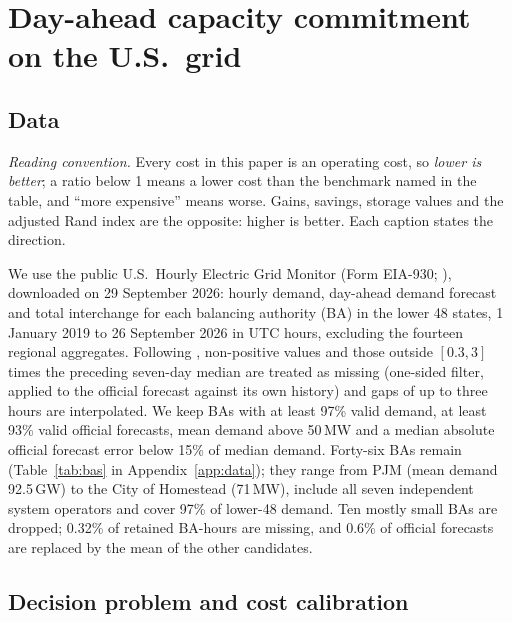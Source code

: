 \section{Day-ahead capacity commitment on the U.S.\ grid}\label{sec:app}

\subsection{Data}

\emph{Reading convention.} Every cost in this paper is an operating cost, so \emph{lower is better}; a ratio below 1 means a lower cost than the benchmark named in the table, and ``more expensive'' means worse. Gains, savings, storage values and the adjusted Rand index are the opposite: higher is better. Each caption states the direction.

We use the public U.S.\ Hourly Electric Grid Monitor (Form EIA-930; \citealp{EIA930}), downloaded on 29 September 2026: hourly demand, day-ahead demand forecast and total interchange for each balancing authority (BA) in the lower 48 states, 1 January 2019 to 26 September 2026 in UTC hours, excluding the fourteen regional aggregates.
Following \citet{Ruggles2020}, non-positive values and those outside $[0.3,3]$ times the preceding seven-day median are treated as missing (one-sided filter, applied to the official forecast against its own history) and gaps of up to three hours are interpolated.
We keep BAs with at least 97\% valid demand, at least 93\% valid official forecasts, mean demand above 50\,MW and a median absolute official forecast error below 15\% of median demand.
Forty-six BAs remain (Table~\ref{tab:bas} in Appendix~\ref{app:data}); they range from PJM (mean demand 92.5\,GW) to the City of Homestead (71\,MW), include all seven independent system operators and cover 97\% of lower-48 demand.
Ten mostly small BAs are dropped; 0.32\% of retained BA-hours are missing, and 0.6\% of official forecasts are replaced by the mean of the other candidates.

\subsection{Decision problem and cost calibration}

